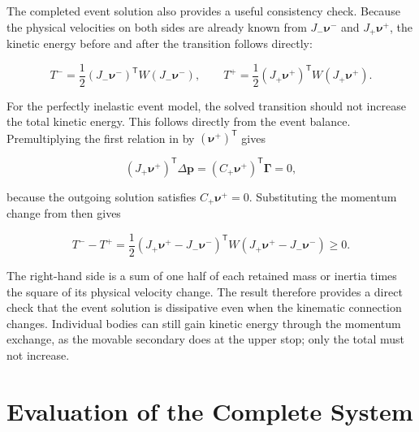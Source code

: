\documentclass[11pt]{report}
\numberwithin{equation}{section}
\begin{document}
\begin{remarkbox}

The completed event solution also provides a useful consistency check.
Because the physical velocities on both sides are already known from
\(J_-\boldsymbol\nu^-\) and \(J_+\boldsymbol\nu^+\), the kinetic energy
before and after the transition follows directly:

\begin{equation}
    T^-
    =
    \frac{1}{2}
    (J_-\boldsymbol\nu^-)^{\mathsf T}
    W
    (J_-\boldsymbol\nu^-),
    \qquad
    T^+
    =
    \frac{1}{2}
    (J_+\boldsymbol\nu^+)^{\mathsf T}
    W
    (J_+\boldsymbol\nu^+).
    \label{eq:finite_event_kinetic_energies}
\end{equation}

For the perfectly inelastic event model, the solved transition should not
increase the total kinetic energy.  This follows directly from the event
balance.  Premultiplying the first relation in
 by
\((\boldsymbol\nu^+)^{\mathsf T}\) gives

\[
    (J_+\boldsymbol\nu^+)^{\mathsf T}\Delta\boldsymbol p
    =
    (C_+\boldsymbol\nu^+)^{\mathsf T}\boldsymbol\Gamma
    =
    0,
\]

because the outgoing solution satisfies
\(C_+\boldsymbol\nu^+=0\).  Substituting the momentum change from
 then gives

\begin{equation}
    T^- - T^+
    =
    \frac{1}{2}
    (J_+\boldsymbol\nu^+-J_-\boldsymbol\nu^-)^{\mathsf T}
    W
    (J_+\boldsymbol\nu^+-J_-\boldsymbol\nu^-)
    \geq 0.
    \label{eq:finite_event_energy_loss}
\end{equation}

The right-hand side is a sum of one half of each retained mass or inertia
times the square of its physical velocity change.  The result therefore
provides a direct check that the event solution is dissipative even when
the kinematic connection changes.  Individual bodies can still gain kinetic
energy through the momentum exchange, as the movable secondary does at the
upper stop; only the total must not increase.

\end{remarkbox}


\section{Evaluation of the Complete System}
\label{sec:complete_system_evaluation}
\end{document}
